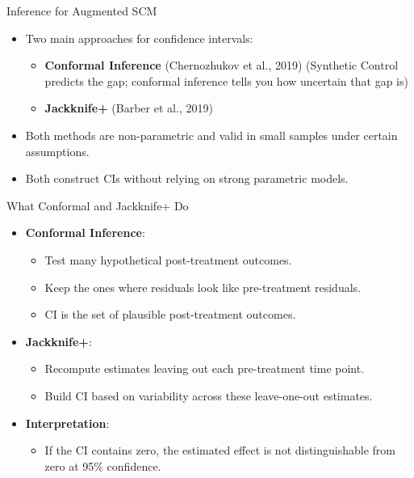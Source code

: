 \documentclass{beamer}
\begin{document}
\begin{frame}{Inference for Augmented SCM}
\small
\begin{itemize}
  \item Two main approaches for confidence intervals:
  \begin{itemize}
    \item \textbf{Conformal Inference} (Chernozhukov et al., 2019) (Synthetic Control predicts the gap; conformal inference tells you how uncertain that gap is)
    \item \textbf{Jackknife+} (Barber et al., 2019)
  \end{itemize}
  \item Both methods are non-parametric and valid in small samples under certain assumptions.
  \item Both construct CIs without relying on strong parametric models.
\end{itemize}
\end{frame}

\begin{frame}{What Conformal and Jackknife+ Do}
\small
\begin{itemize}
  \item \textbf{Conformal Inference}:
  \begin{itemize}
    \item Test many hypothetical post-treatment outcomes.
    \item Keep the ones where residuals look like pre-treatment residuals.
    \item CI is the set of plausible post-treatment outcomes.
  \end{itemize}
  \item \textbf{Jackknife+}:
  \begin{itemize}
    \item Recompute estimates leaving out each pre-treatment time point.
    \item Build CI based on variability across these leave-one-out estimates.
  \end{itemize}
  \item \textbf{Interpretation}: 
  \begin{itemize}
    \item If the CI contains zero, the estimated effect is not distinguishable from zero at 95\% confidence.
  \end{itemize}
\end{itemize}
\end{frame}
\end{document}
